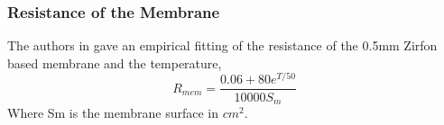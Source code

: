 


\subsubsection{Resistance of the Membrane}
The authors in  gave an empirical fitting of the resistance of the 0.5mm Zirfon based membrane and the temperature,
\begin{equation}
R_{mem} = \frac{0.06+80e^{T/50}}{10000S_m}
\end{equation}
Where Sm is the membrane surface in $cm^2$.

